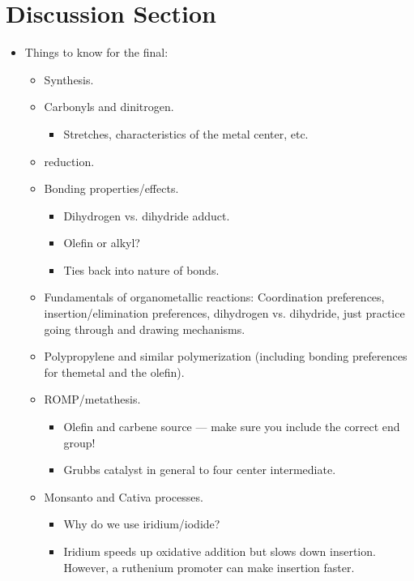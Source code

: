 \documentclass[../notes.tex]{subfiles}
\begin{document}
\section{Discussion Section}
\begin{itemize}
    \item {}Things to know for the final:
    \begin{itemize}
        \item Synthesis.
        \item Carbonyls and dinitrogen.
        \begin{itemize}
            \item Stretches, characteristics of the metal center, etc.
        \end{itemize}
        \item {} reduction.
        \item Bonding properties/effects.
        \begin{itemize}
            \item Dihydrogen vs. dihydride adduct.
            \item Olefin or alkyl?
            \item Ties back into nature of  bonds.
        \end{itemize}
        \item Fundamentals of organometallic reactions: Coordination preferences, insertion/elimination preferences, dihydrogen vs. dihydride, just practice going through and drawing mechanisms.
        \item Polypropylene and similar polymerization (including bonding preferences for themetal and the olefin).
        \item ROMP/metathesis.
        \begin{itemize}
            \item Olefin and carbene source --- make sure you include the correct end group!
            \item Grubbs catalyst in general to four center intermediate.
        \end{itemize}
        \item Monsanto and Cativa processes.
        \begin{itemize}
            \item Why do we use iridium/iodide?
            \item Iridium speeds up oxidative addition but slows down insertion. However, a ruthenium promoter can make insertion faster.
        \end{itemize}

\end{itemize}
\end{itemize}
\end{document}
